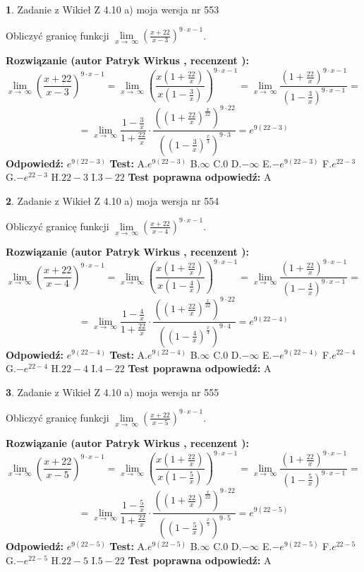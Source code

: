 \documentclass[12pt, a4paper]{article}
\theoremstyle{definition} %
\newtheorem{zad}{}
\newcommand{\zadStart}[1]{\begin{zad}#1\newline}
\newcommand{\zadStop}{\end{zad}}
\newcommand{\rozwStart}[2]{\noindent \textbf{Rozwiązanie (autor #1 , recenzent #2): }\newline}
\newcommand{\rozwStop}{\newline}
\newcommand{\odpStart}{\noindent \textbf{Odpowiedź:}\newline}
\newcommand{\odpStop}{\newline}
\newcommand{\testStart}{\noindent \textbf{Test:}\newline}
\newcommand{\testStop}{\newline}
\newcommand{\kluczStart}{\noindent \textbf{Test poprawna odpowiedź:}\newline}
\newcommand{\kluczStop}{\newline}
\begin{document}
\zadStart{Zadanie z Wikieł Z 4.10 a) moja wersja nr 553}


Obliczyć granicę funkcji  $\lim\limits_{x\to\ \infty}(\frac{x+22}{x-3})^{9\cdot x-1}$.
\zadStop
\rozwStart{Patryk Wirkus}{}
$$\lim\limits_{x\to\ \infty}(\frac{x+22}{x-3})^{9\cdot x-1} = \lim\limits_{x\to\ \infty}(\frac{x(1+\frac{22}{x})}{x(1-\frac{3}{x})})^{9\cdot x-1}=\lim\limits_{x\to\ \infty}\frac{(1+\frac{22}{x})^{9\cdot x-1}}{(1-\frac{3}{x})^{9\cdot x-1}}=$$
$$=\lim\limits_{x\to\ \infty}\frac{1-\frac{3}{x}}{1+\frac{22}{x}}\cdot\frac{((1+\frac{22}{x})^{\frac{x}{22}})^{9\cdot22}}{((1-\frac{3}{x})^{\frac{x}{3}})^{9\cdot3}}=e^{9(22-3)}$$
\rozwStop
\odpStart
$e^{9(22-3)}$
\odpStop
\testStart
A.$e^{9(22-3)}$ B.$\infty$ C.$0$ D.$-\infty$ E.$-e^{9(22-3)}$
F.$e^{22-3}$ G.$-e^{22-3}$
H.$22-3$
I.$3-22$
\testStop
\kluczStart
A
\kluczStop



\zadStart{Zadanie z Wikieł Z 4.10 a) moja wersja nr 554}


Obliczyć granicę funkcji  $\lim\limits_{x\to\ \infty}(\frac{x+22}{x-4})^{9\cdot x-1}$.
\zadStop
\rozwStart{Patryk Wirkus}{}
$$\lim\limits_{x\to\ \infty}(\frac{x+22}{x-4})^{9\cdot x-1} = \lim\limits_{x\to\ \infty}(\frac{x(1+\frac{22}{x})}{x(1-\frac{4}{x})})^{9\cdot x-1}=\lim\limits_{x\to\ \infty}\frac{(1+\frac{22}{x})^{9\cdot x-1}}{(1-\frac{4}{x})^{9\cdot x-1}}=$$
$$=\lim\limits_{x\to\ \infty}\frac{1-\frac{4}{x}}{1+\frac{22}{x}}\cdot\frac{((1+\frac{22}{x})^{\frac{x}{22}})^{9\cdot22}}{((1-\frac{4}{x})^{\frac{x}{4}})^{9\cdot4}}=e^{9(22-4)}$$
\rozwStop
\odpStart
$e^{9(22-4)}$
\odpStop
\testStart
A.$e^{9(22-4)}$ B.$\infty$ C.$0$ D.$-\infty$ E.$-e^{9(22-4)}$
F.$e^{22-4}$ G.$-e^{22-4}$
H.$22-4$
I.$4-22$
\testStop
\kluczStart
A
\kluczStop



\zadStart{Zadanie z Wikieł Z 4.10 a) moja wersja nr 555}


Obliczyć granicę funkcji  $\lim\limits_{x\to\ \infty}(\frac{x+22}{x-5})^{9\cdot x-1}$.
\zadStop
\rozwStart{Patryk Wirkus}{}
$$\lim\limits_{x\to\ \infty}(\frac{x+22}{x-5})^{9\cdot x-1} = \lim\limits_{x\to\ \infty}(\frac{x(1+\frac{22}{x})}{x(1-\frac{5}{x})})^{9\cdot x-1}=\lim\limits_{x\to\ \infty}\frac{(1+\frac{22}{x})^{9\cdot x-1}}{(1-\frac{5}{x})^{9\cdot x-1}}=$$
$$=\lim\limits_{x\to\ \infty}\frac{1-\frac{5}{x}}{1+\frac{22}{x}}\cdot\frac{((1+\frac{22}{x})^{\frac{x}{22}})^{9\cdot22}}{((1-\frac{5}{x})^{\frac{x}{5}})^{9\cdot5}}=e^{9(22-5)}$$
\rozwStop
\odpStart
$e^{9(22-5)}$
\odpStop
\testStart
A.$e^{9(22-5)}$ B.$\infty$ C.$0$ D.$-\infty$ E.$-e^{9(22-5)}$
F.$e^{22-5}$ G.$-e^{22-5}$
H.$22-5$
I.$5-22$
\testStop
\kluczStart
A
\kluczStop
\end{document}
